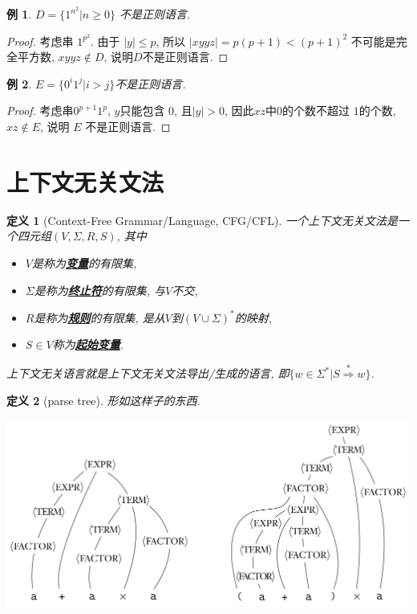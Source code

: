 \documentclass[8pt]{article}
\theoremstyle{compact}
\newtheorem{definition}{定义}[section]
\newtheorem{example}{例}[section]
\def\obj#1{\textbf{\uline{#1}}}
\def\le{\leqslant}
\def\ge{\geqslant}
\begin{document}
\begin{example}
	$D = \{1^{n^2} | n \ge 0\}$ 不是正则语言.
\end{example}
\begin{proof}
	考虑串 $1^{p^2}$. 由于 $|y| \le p$, 所以 $|xyyz| = p(p+1) < (p+1)^2$ 不可能是完全平方数, $xyyz \notin D$, 说明$D$不是正则语言.
\end{proof}
\begin{example}
	$E = \{0^i1^j | i > j\}$不是正则语言. 
\end{example}
\begin{proof}
	考虑串$0^{p+1}1^p$, $y$只能包含 $0$, 且$|y| > 0$, 因此$xz$中$0$的个数不超过 $1$的个数, $xz \notin E$, 说明 $E$ 不是正则语言.
\end{proof}
\newpage
\section{上下文无关文法}
\begin{definition}[Context-Free Grammar/Language, CFG/CFL]
	一个上下文无关文法是一个四元组$(V, \Sigma, R, S)$, 其中
	\begin{itemize}
		\item $V$是称为\obj{变量}的有限集, 
		\item $\Sigma$是称为\obj{终止符}的有限集, 与$V$不交, 
		\item $R$是称为\obj{规则}的有限集, 是从$V$到$(V \cup \Sigma)^*$的映射, 
		\item $S \in V$称为\obj{起始变量}. 
	\end{itemize}

	上下文无关语言就是上下文无关文法导出/生成的语言, 即$\{w \in \Sigma^* | S \overset{*}{\Rightarrow} w\}$. 
\end{definition}
\begin{definition}[parse tree]
	形如这样子的东西.
	\begin{center}
		\includegraphics*[scale=0.4]{pic/parse_tree.png}	
	\end{center}
\end{definition}
\end{document}

